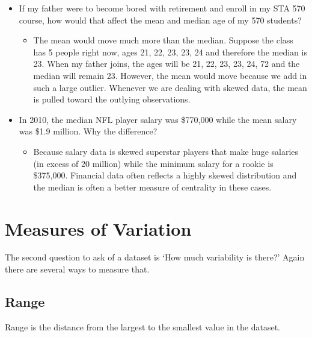\documentclass[]{book}
\newenvironment{Shaded}{\begin{snugshade}}{\end{snugshade}}
\newcommand{\KeywordTok}[1]{\textcolor[rgb]{0.13,0.29,0.53}{\textbf{{#1}}}}
\newcommand{\DataTypeTok}[1]{\textcolor[rgb]{0.13,0.29,0.53}{{#1}}}
\newcommand{\StringTok}[1]{\textcolor[rgb]{0.31,0.60,0.02}{{#1}}}
\newcommand{\CommentTok}[1]{\textcolor[rgb]{0.56,0.35,0.01}{\textit{{#1}}}}
\newcommand{\NormalTok}[1]{{#1}}
\providecommand{\tightlist}{%
  \setlength{\itemsep}{0pt}\setlength{\parskip}{0pt}}
\begin{document}
\begin{itemize}
\tightlist
\item
  If my father were to become bored with retirement and enroll in my STA
  570 course, how would that affect the mean and median age of my 570
  students?

  \begin{itemize}
  \tightlist
  \item
    The mean would move much more than the median. Suppose the class has
    5 people right now, ages 21, 22, 23, 23, 24 and therefore the median
    is 23. When my father joins, the ages will be 21, 22, 23, 23, 24, 72
    and the median will remain 23. However, the mean would move because
    we add in such a large outlier. Whenever we are dealing with skewed
    data, the mean is pulled toward the outlying observations.
  \end{itemize}
\item
  In 2010, the median NFL player salary was \$770,000 while the mean
  salary was \$1.9 million. Why the difference?

  \begin{itemize}
  \tightlist
  \item
    Because salary data is skewed superstar players that make huge
    salaries (in excess of 20 million) while the minimum salary for a
    rookie is \$375,000. Financial data often reflects a highly skewed
    distribution and the median is often a better measure of centrality
    in these cases.
  \end{itemize}
\end{itemize}

\section{Measures of Variation}\label{measures-of-variation}

The second question to ask of a dataset is `How much variability is
there?' Again there are several ways to measure that.

\subsection{Range}\label{range}

Range is the distance from the largest to the smallest value in the
dataset.

\begin{Shaded}
\end{Shaded}
\end{document}
